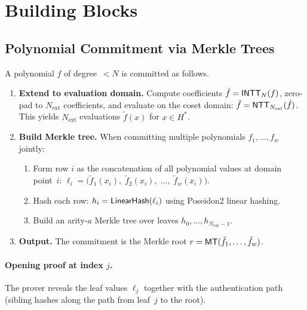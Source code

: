 \section{Building Blocks}
\label{sec:building-blocks}

\subsection{Polynomial Commitment via Merkle Trees}
\label{sec:commitment}

A polynomial $f$ of degree~$< N$ is committed as follows.

\begin{enumerate}[label=\arabic*.]
  \item \textbf{Extend to evaluation domain.}
        Compute coefficients $\hat{f} = \textsf{INTT}_N(f)$, zero-pad to $N_{\mathrm{ext}}$
        coefficients, and evaluate on the coset domain:
        $\tilde{f} = \textsf{NTT}_{N_{\mathrm{ext}}}(\hat{f})$.
        This yields $N_{\mathrm{ext}}$ evaluations $\tilde{f}(x)$ for $x \in H^*$.

  \item \textbf{Build Merkle tree.}
        When committing multiple polynomials $f_1, \ldots, f_w$ jointly:
        \begin{enumerate}[label=(\alph*)]
          \item Form row $i$ as the concatenation of all polynomial values at domain
                point~$i$:
                $\ell_i = \bigl(\tilde{f}_1(x_i),\; \tilde{f}_2(x_i),\; \ldots,\; \tilde{f}_w(x_i)\bigr)$.
          \item Hash each row: $h_i = \textsf{LinearHash}(\ell_i)$ using Poseidon2 linear hashing.
          \item Build an arity-$a$ Merkle tree over leaves $h_0, \ldots, h_{N_{\mathrm{ext}}-1}$.
        \end{enumerate}

  \item \textbf{Output.}
        The commitment is the Merkle root $r = \textsf{MT}(\tilde{f}_1, \ldots, \tilde{f}_w)$.
\end{enumerate}

\paragraph{Opening proof at index $j$.}
The prover reveals the leaf values $\ell_j$ together with the authentication path
(sibling hashes along the path from leaf~$j$ to the root).

